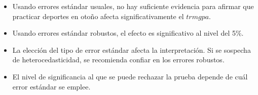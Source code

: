 \documentclass[10pt,a4paper]{article}
\begin{document}
\begin{enumerate}
{\begin{itemize}
    \item Usando errores estándar usuales, no hay suficiente evidencia para afirmar que practicar deportes en otoño afecta significativamente el \(trmgpa\).
    \item Usando errores estándar robustos, el efecto es  significativo al nivel del 5\%.
    \item La elección del tipo de error estándar afecta la interpretación. Si se sospecha de heterocedasticidad, se recomienda confiar en los errores robustos.
    \item El nivel de significancia al que se puede rechazar
la prueba depende de cu\'al error est\'andar se emplee.
\end{itemize}
}

\end{enumerate}
\end{document}
